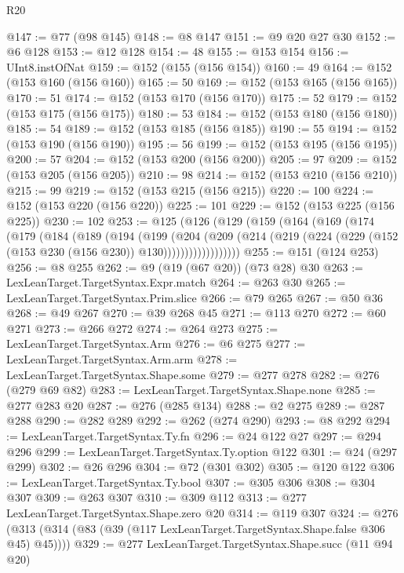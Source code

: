 \begin{lexlean}{R20}
\begin{coremodule}
@147 := @77 (@98 @145)
@148 := @8 @147
@151 := @9 @20 @27 @30
@152 := @6 @128
@153 := @12 @128
@154 := 48
@155 := @153 @154
@156 := UInt8.instOfNat
@159 := @152 (@155 (@156 @154))
@160 := 49
@164 := @152 (@153 @160 (@156 @160))
@165 := 50
@169 := @152 (@153 @165 (@156 @165))
@170 := 51
@174 := @152 (@153 @170 (@156 @170))
@175 := 52
@179 := @152 (@153 @175 (@156 @175))
@180 := 53
@184 := @152 (@153 @180 (@156 @180))
@185 := 54
@189 := @152 (@153 @185 (@156 @185))
@190 := 55
@194 := @152 (@153 @190 (@156 @190))
@195 := 56
@199 := @152 (@153 @195 (@156 @195))
@200 := 57
@204 := @152 (@153 @200 (@156 @200))
@205 := 97
@209 := @152 (@153 @205 (@156 @205))
@210 := 98
@214 := @152 (@153 @210 (@156 @210))
@215 := 99
@219 := @152 (@153 @215 (@156 @215))
@220 := 100
@224 := @152 (@153 @220 (@156 @220))
@225 := 101
@229 := @152 (@153 @225 (@156 @225))
@230 := 102
@253 := @125
    (@126
      (@129
        (@159
          (@164
            (@169
              (@174
                (@179
                  (@184
                    (@189
                      (@194
                        (@199
                          (@204
                            (@209
                              (@214
                                (@219
                                  (@224 (@229 (@152 (@153 @230 (@156 @230)) @130))))))))))))))))))
@255 := @151 (@124 @253)
@256 := @8 @255
@262 := @9 (@19 (@67 @20)) (@73 @28) @30
@263 := LexLeanTarget.TargetSyntax.Expr.match
@264 := @263 @30
@265 := LexLeanTarget.TargetSyntax.Prim.slice
@266 := @79 @265
@267 := @50 @36
@268 := @49 @267
@270 := @39 @268 @45
@271 := @113 @270
@272 := @60 @271
@273 := @266 @272
@274 := @264 @273
@275 := LexLeanTarget.TargetSyntax.Arm
@276 := @6 @275
@277 := LexLeanTarget.TargetSyntax.Arm.arm
@278 := LexLeanTarget.TargetSyntax.Shape.some
@279 := @277 @278
@282 := @276 (@279 @69 @82)
@283 := LexLeanTarget.TargetSyntax.Shape.none
@285 := @277 @283 @20
@287 := @276 (@285 @134)
@288 := @2 @275
@289 := @287 @288
@290 := @282 @289
@292 := @262 (@274 @290)
@293 := @8 @292
@294 := LexLeanTarget.TargetSyntax.Ty.fn
@296 := @24 @122 @27
@297 := @294 @296
@299 := LexLeanTarget.TargetSyntax.Ty.option @122
@301 := @24 (@297 @299)
@302 := @26 @296
@304 := @72 (@301 @302)
@305 := @120 @122
@306 := LexLeanTarget.TargetSyntax.Ty.bool
@307 := @305 @306
@308 := @304 @307
@309 := @263 @307
@310 := @309 @112
@313 := @277 LexLeanTarget.TargetSyntax.Shape.zero @20
@314 := @119 @307
@324 := @276 (@313 (@314 (@83 (@39 (@117 LexLeanTarget.TargetSyntax.Shape.false @306 @45) @45))))
@329 := @277 LexLeanTarget.TargetSyntax.Shape.succ (@11 @94 @20)

\end{coremodule}
\end{lexlean}
